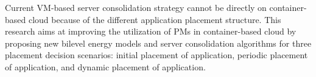 Current VM-based server consolidation strategy cannot be directly on container-based cloud because of the different application placement structure. This research aims at improving the utilization of PMs in container-based cloud by proposing new bilevel energy models and server consolidation algorithms for three placement decision scenarios: initial placement of application, periodic placement of application, and dynamic placement of application.





\vspace{5mm}
